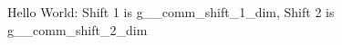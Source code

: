 \documentclass{article}
\begin{document}
Hello World: Shift 1 is \csname g__comm_shift_1_dim\endcsname, Shift 2 is \csname g__comm_shift_2_dim\endcsname
\end{document}
